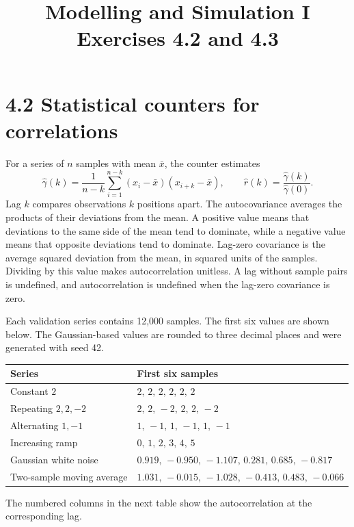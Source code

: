 \documentclass[a4paper,11pt]{article}
\title{Modelling and Simulation I\\Exercises 4.2 and 4.3}
\author{}
\date{}
\begin{document}
\maketitle

\section*{4.2 Statistical counters for correlations}

For a series of \(n\) samples with mean \(\bar{x}\), the counter estimates
\[
\widehat{\gamma}(k)=
\frac{1}{n-k}\sum_{i=1}^{n-k}(x_i-\bar{x})(x_{i+k}-\bar{x}),
\qquad
\widehat{r}(k)=\frac{\widehat{\gamma}(k)}{\widehat{\gamma}(0)}.
\]
Lag \(k\) compares observations \(k\) positions apart. The
autocovariance averages the products of their deviations from the
mean. A positive value means that deviations to the same side of the
mean tend to dominate, while a negative value means that opposite
deviations tend to dominate. Lag-zero covariance is the average
squared deviation from the mean, in squared units of the samples.
Dividing by this value makes autocorrelation unitless. A lag without
sample pairs is undefined, and autocorrelation is undefined when the
lag-zero covariance is zero.

Each validation series contains 12,000 samples. The first six values
are shown below. The Gaussian-based values are rounded to three
decimal places and were generated with seed 42.

\begin{center}
\small
\begin{tabular}{ll}
\hline
Series & First six samples \\
\hline
Constant \(2\) & \(2,\,2,\,2,\,2,\,2,\,2\) \\
Repeating \(2,2,-2\) & \(2,\,2,\,-2,\,2,\,2,\,-2\) \\
Alternating \(1,-1\) & \(1,\,-1,\,1,\,-1,\,1,\,-1\) \\
Increasing ramp & \(0,\,1,\,2,\,3,\,4,\,5\) \\
Gaussian white noise & \(0.919,\,-0.950,\,-1.107,\,0.281,\,0.685,\,-0.817\) \\
Two-sample moving average & \(1.031,\,-0.015,\,-1.028,\,-0.413,\,0.483,\,-0.066\) \\
\hline
\end{tabular}
\end{center}

The numbered columns in the next table show the autocorrelation
at the corresponding lag.
\end{document}
